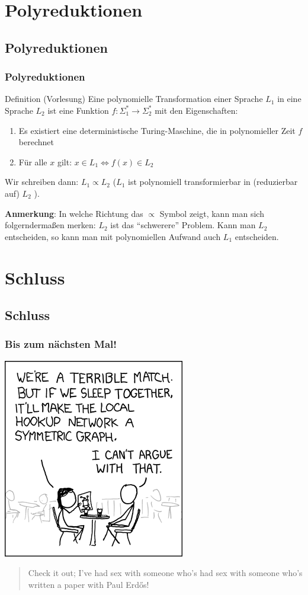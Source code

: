 \section{Polyreduktionen}
\subsection{Polyreduktionen}
\begin{frame}
\frametitle{Polyreduktionen}
\begin{block}{Definition (Vorlesung)}
Eine polynomielle Transformation einer Sprache $L_1$ in eine Sprache $L_2$ ist eine Funktion
$f: \Sigma^*_1 \rightarrow \Sigma^*_2$ mit den Eigenschaften:
\begin{enumerate}
\item Es existiert eine deterministische Turing-Maschine, die in polynomieller Zeit $f$ berechnet
\item Für alle $x$ gilt: $x \in L_1 \iff f(x) \in  L_2$
\end{enumerate}
Wir schreiben dann: $L_1 \propto L_2$ ($L_1$ ist polynomiell transformierbar in (reduzierbar auf) $L_2$ ).
\end{block}
\textbf{Anmerkung}: In welche Richtung das $\propto$ Symbol zeigt, kann man sich folgerndermaßen  merken:
$L_2$ ist das "`schwerere"' Problem. Kann man $L_2$ entscheiden, so kann man mit polynomiellen Aufwand auch $L_1$ entscheiden.
\end{frame}

\section{Schluss}
\subsection{Schluss}
\begin{frame}
	\frametitle{Bis zum nächsten Mal!}
	\begin{center}
		\includegraphics[scale=0.5]{images/xkcd-403.png}
	\end{center}

	\begin{quote}
		\scriptsize{Check it out; I've had sex with someone who's had sex with someone who's written a paper with Paul Erdős!}
	\end{quote}
\end{frame}

